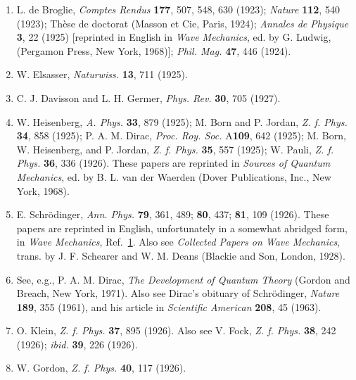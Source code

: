 
\begin{enumerate}
\item\label{ref:1.1} L. de Broglie, \emph{Comptes Rendus} \textbf{177}, 507, 548, 630
(1923); \emph{Nature} \textbf{112}, 540 (1923); Th\`ese de doctorat (Masson et
Cie, Paris, 1924); \emph{Annales de Physique} \textbf{3}, 22 (1925)
[reprinted in English in \emph{Wave Mechanics}, ed. by G. Ludwig, (Pergamon
Press, New York, 1968)]; \emph{Phil. Mag.} \textbf{47}, 446 (1924).

\item\label{ref:1.2} W. Elsasser, \emph{Naturwiss.} \textbf{13}, 711 (1925).

\item\label{ref:1.3} C. J. Davisson and L. H. Germer, \emph{Phys. Rev.} \textbf{30}, 705
(1927).

\item\label{ref:1.4} W. Heisenberg, \emph{A. Phys.} \textbf{33}, 879 (1925); M. Born and P.
Jordan, \emph{Z. f. Phys.} \textbf{34}, 858 (1925); P. A. M. Dirac, \emph{Proc.
Roy. Soc.} A\textbf{109}, 642 (1925); M. Born, W. Heisenberg, and P. Jordan,
\emph{Z. f. Phys.} \textbf{35}, 557 (1925); W. Pauli, \emph{Z. f. Phys.}
\textbf{36}, 336 (1926). These papers are reprinted in \emph{Sources of
Quantum Mechanics}, ed. by B. L. van der Waerden (Dover Publications, Inc.,
New York, 1968).

\item\label{ref:1.5} E. Schr\"odinger, \emph{Ann. Phys.} \textbf{79}, 361, 489; \textbf{80},
437; \textbf{81}, 109 (1926). These papers are reprinted in English,
unfortunately in a somewhat abridged form, in \emph{Wave Mechanics}, Ref.~\hyperref[ref:1.1]{1}.
Also see \emph{Collected Papers on Wave Mechanics}, trans. by J. F. Schearer
and W. M. Deans (Blackie and Son, London, 1928).

\item\label{ref:1.6} See, e.g., P. A. M. Dirac, \emph{The Development of Quantum Theory}
(Gordon and Breach, New York, 1971). Also see Dirac's obituary of Schr\"odinger,
\emph{Nature} \textbf{189}, 355 (1961), and his article in \emph{Scientific
American} \textbf{208}, 45 (1963).

\item\label{ref:1.7} O. Klein, \emph{Z. f. Phys.} \textbf{37}, 895 (1926). Also see V. Fock,
\emph{Z. f. Phys.} \textbf{38}, 242 (1926); \emph{ibid.} \textbf{39}, 226
(1926).

\item\label{ref:1.8} W. Gordon, \emph{Z. f. Phys.} \textbf{40}, 117 (1926).


\end{enumerate}
